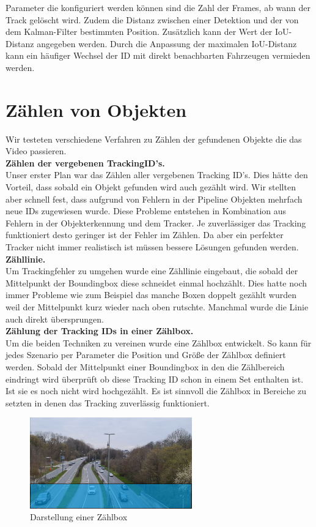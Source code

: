\documentclass[conference]{IEEEtran}
\begin{document}
	Parameter die konfiguriert werden können sind die Zahl der Frames, ab wann der
	Track gelöscht wird. Zudem die Distanz zwischen einer Detektion und der von dem
	Kalman-Filter bestimmten Position. Zusätzlich kann der Wert der IoU-Distanz angegeben werden.
	Durch die Anpassung der maximalen IoU-Distanz
	kann ein häufiger Wechsel der ID mit direkt benachbarten Fahrzeugen vermieden werden.
	
	\section{Zählen von Objekten}
	Wir testeten verschiedene Verfahren zu Zählen der gefundenen Objekte die das Video passieren.\\
	\textbf{Zählen der vergebenen TrackingID's.}\\
	 Unser erster Plan war das Zählen aller vergebenen Tracking ID's. Dies hätte den Vorteil, dass sobald ein Objekt gefunden wird auch gezählt wird. Wir stellten aber schnell fest, dass aufgrund von Fehlern in der Pipeline Objekten mehrfach neue IDs zugewiesen wurde. Diese Probleme entstehen in Kombination aus Fehlern in der Objekterkennung und dem Tracker. Je zuverlässiger das Tracking funktioniert desto geringer ist der Fehler im Zählen. Da aber ein perfekter Tracker nicht immer realistisch ist müssen bessere Lösungen gefunden werden.\\
	\textbf{Zähllinie.}\\
	 Um Trackingfehler zu umgehen wurde eine Zähllinie eingebaut, die sobald der Mittelpunkt der Boundingbox diese schneidet einmal hochzählt. Dies hatte noch immer Probleme wie zum Beispiel das manche Boxen doppelt gezählt wurden weil der Mittelpunkt kurz wieder nach oben rutschte. Manchmal wurde die Linie auch direkt übersprungen.\\
	\textbf{Zählung der Tracking IDs in einer Zählbox.}\\
	 Um die beiden Techniken zu vereinen wurde eine Zählbox entwickelt. So kann für jedes Szenario per Parameter die Position und Größe der Zählbox definiert werden. Sobald der Mittelpunkt einer Boundingbox in den die Zählbereich eindringt wird überprüft ob diese Tracking ID schon in einem Set enthalten ist. Ist sie es noch nicht wird hochgezählt. Es ist sinnvoll die Zählbox in Bereiche zu setzten in denen das Tracking zuverlässig funktioniert. 
	\begin{figure}[!h]
		\begin{center}
			\includegraphics[width=7cm]{Media/BrudermuhlCounter.png}
			\caption{Darstellung einer Zählbox}
			\label{Counter}
		\end{center}
	\end{figure}
	
\end{document}
